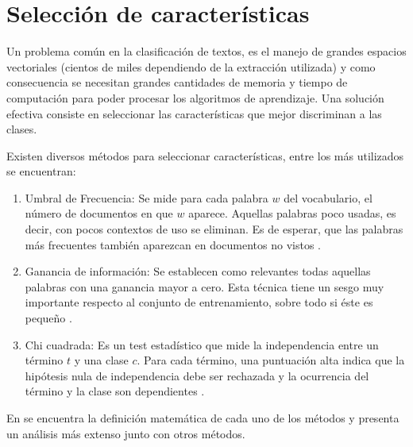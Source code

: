 \section{Selección de características}

Un problema común en la clasificación de textos, es el manejo de grandes espacios vectoriales (cientos de miles dependiendo de la extracción utilizada) y como consecuencia se necesitan grandes cantidades de memoria y tiempo de computación para poder procesar los algoritmos de aprendizaje. Una solución efectiva consiste en seleccionar las características que mejor discriminan a las clases.

Existen diversos métodos para seleccionar características, entre los más utilizados se encuentran:

\begin{enumerate}
    \item Umbral de Frecuencia: Se mide para cada palabra $w$ del vocabulario, el número de documentos en que $w$ aparece. Aquellas palabras poco usadas, es decir, con pocos contextos de uso se eliminan. Es de esperar, que las palabras más frecuentes también aparezcan en documentos no vistos \citep{yang1997comparative}.
    
    \item Ganancia de información: Se establecen como relevantes todas aquellas palabras con una ganancia mayor a cero. Esta técnica tiene un sesgo muy importante respecto al conjunto de entrenamiento, sobre todo si éste es pequeño \citep{yang1997comparative}.   
    \item Chi cuadrada: Es un test estadístico que mide la independencia entre un término $t$ y una clase $c$. Para cada término, una puntuación alta indica que la hipótesis nula de independencia debe ser rechazada y la ocurrencia del término y la clase son dependientes \citep{yang1997comparative}.
\end{enumerate}

En \citep{yang1997comparative} se encuentra la definición matemática de cada uno de los métodos y \citep{forman2003extensive} presenta un análisis más extenso junto con otros métodos. 
